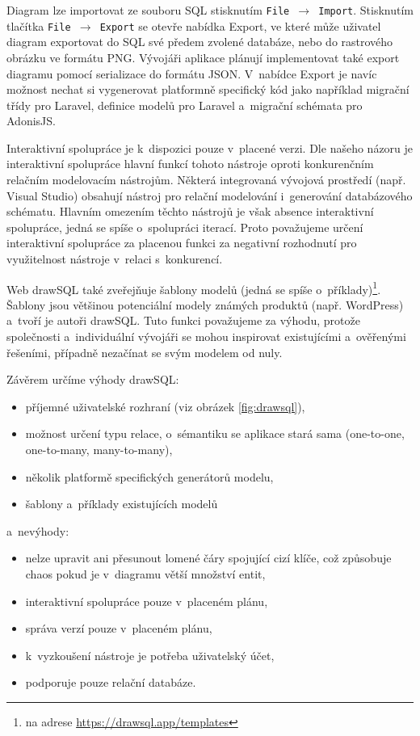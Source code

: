 Diagram lze importovat ze souboru SQL stisknutím \texttt{File $\rightarrow$
Import}. Stisknutím tlačítka \texttt{File $\rightarrow$ Export} se otevře
nabídka Export, ve které může uživatel diagram exportovat do SQL své předem
zvolené databáze, nebo do rastrového obrázku ve formátu PNG. Vývojáři aplikace
plánují implementovat také export diagramu pomocí serializace do formátu JSON.
V~nabídce Export je navíc možnost nechat si vygenerovat platformně specifický
kód jako například migrační třídy pro Laravel, definice modelů pro Laravel
a~migrační schémata pro AdonisJS.

Interaktivní spolupráce je k~dispozici pouze v~placené verzi. Dle našeho názoru
je interaktivní spolupráce hlavní funkcí tohoto nástroje oproti konkurenčním
relačním modelovacím nástrojům. Některá integrovaná vývojová prostředí (např.
Visual Studio) obsahují nástroj pro relační modelování i~generování databázového
schématu. Hlavním omezením těchto nástrojů je však absence interaktivní
spolupráce, jedná se spíše o~spolupráci iterací. Proto považujeme určení
interaktivní spolupráce za placenou funkci za negativní rozhodnutí pro
využitelnost nástroje v~relaci s~konkurencí.

Web drawSQL také zveřejňuje šablony modelů (jedná se spíše
o~příklady)\footnote{na adrese \url{https://drawsql.app/templates}}. Šablony
jsou většinou potenciální modely známých produktů (např. WordPress) a~tvoří je
autoři drawSQL. Tuto funkci považujeme za výhodu, protože společnosti
a~individuální vývojáři se mohou inspirovat existujícími a~ověřenými řešeními,
případně nezačínat se svým modelem od nuly.

Závěrem určíme výhody drawSQL:
\begin{itemize}
  \item příjemné uživatelské rozhraní (viz obrázek \ref{fig:drawsql}),
  \item možnost určení typu relace, o~sémantiku se aplikace stará sama
  (one-to-one, one-to-many, many-to-many),
  \item několik platformě specifických generátorů modelu,
  \item šablony a~příklady existujících modelů
\end{itemize}
a~nevýhody:
\begin{itemize}
  \item nelze upravit ani přesunout lomené čáry spojující cizí klíče, což
  způsobuje chaos pokud je v~diagramu větší množství entit,
  \item interaktivní spolupráce pouze v~placeném plánu,
  \item správa verzí pouze v~placeném plánu,
  \item k~vyzkoušení nástroje je potřeba uživatelský účet,
  \item podporuje pouze relační databáze.
\end{itemize}

